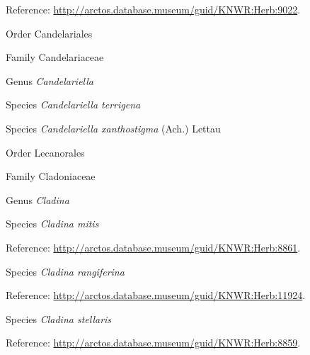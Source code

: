 \documentclass[9pt, article]{memoir}
\begin{document}
\begin{multicols}{2}
\vspace{6pt}Reference: 
\url{http://arctos.database.museum/guid/KNWR:Herb:9022}.

\vspace{6pt}\noindent\hspace{18pt}Order Candelariales


\vspace{6pt}\noindent\hspace{24pt}Family Candelariaceae


\vspace{6pt}\noindent\hspace{30pt}Genus \textit{Candelariella}


\vspace{6pt}\noindent\hspace{36pt}Species \textit{Candelariella terrigena}


\vspace{6pt}\noindent\hspace{36pt}Species \textit{Candelariella xanthostigma} (Ach.) Lettau


\vspace{6pt}\noindent\hspace{18pt}Order Lecanorales


\vspace{6pt}\noindent\hspace{24pt}Family Cladoniaceae


\vspace{6pt}\noindent\hspace{30pt}Genus \textit{Cladina}


\vspace{6pt}\noindent\hspace{36pt}Species \textit{Cladina mitis}


\vspace{6pt}Reference: 
\url{http://arctos.database.museum/guid/KNWR:Herb:8861}.

\vspace{6pt}\noindent\hspace{36pt}Species \textit{Cladina rangiferina}


\vspace{6pt}Reference: 
\url{http://arctos.database.museum/guid/KNWR:Herb:11924}.

\vspace{6pt}\noindent\hspace{36pt}Species \textit{Cladina stellaris}


\vspace{6pt}Reference: 
\url{http://arctos.database.museum/guid/KNWR:Herb:8859}.


\end{multicols}
\end{document}
